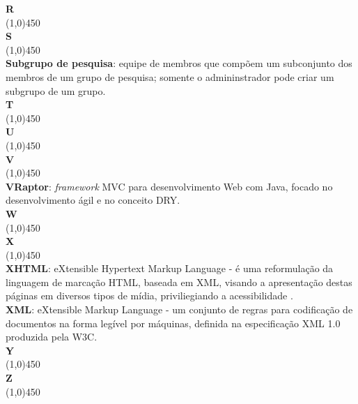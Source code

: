 \documentclass[11pt, a4paper]{article}
\begin{document}
	\noindent\textbf{\huge{R}}\\
	\line(1,0){450}\\
	
	\noindent\textbf{\huge{S}}\\
	\line(1,0){450}\\
	\textbf{Subgrupo de pesquisa}: equipe de membros que compõem um subconjunto dos membros de um grupo de 
	pesquisa; somente o admininstrador pode criar um subgrupo de um grupo.\\
		
	\noindent\textbf{\huge{T}}\\
	\line(1,0){450}\\
		
	\noindent\textbf{\huge{U}}\\
	\line(1,0){450}\\
		
	\noindent\textbf{\huge{V}}\\
	\line(1,0){450}\\
	\textbf{VRaptor}: \emph{framework} MVC para desenvolvimento Web com Java, focado no desenvolvimento ágil e no conceito DRY.\\
	
	\noindent\textbf{\huge{W}}\\
	\line(1,0){450}\\
		
	\noindent\textbf{\huge{X}}\\
	\line(1,0){450}\\
	\textbf{XHTML}: eXtensible Hypertext Markup Language - é uma reformulação 
	da linguagem de marcação HTML, baseada em XML, visando a apresentação destas páginas em diversos tipos de mídia, priviliegiando a acessibilidade .\\
	\textbf{XML}: eXtensible Markup Language - um conjunto de regras para codificação de documentos na forma legível por máquinas, definida na especificação XML 1.0 produzida pela W3C.\\
	
	\noindent\textbf{\huge{Y}}\\
	\line(1,0){450}\\
		
	\noindent\textbf{\huge{Z}}\\
	\line(1,0){450}\\
	
\end{document}
